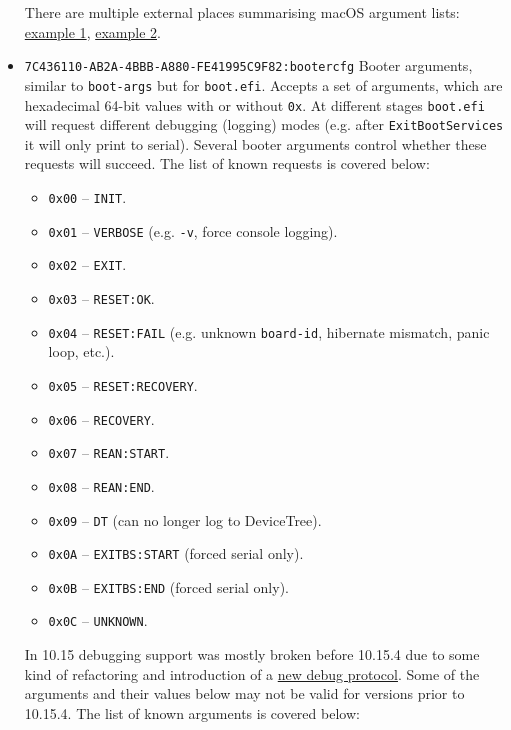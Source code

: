 \documentclass[]{article}
\providecommand{\tightlist}{%
  \setlength{\itemsep}{0pt}\setlength{\parskip}{0pt}}
\begin{document}
\begin{itemize}
  There are multiple external places summarising macOS argument lists:
  \href{https://osxeon.wordpress.com/2015/08/10/boot-argument-options-in-os-x}{example 1},
  \href{https://superuser.com/questions/255176/is-there-a-list-of-available-boot-args-for-darwin-os-x}{example 2}.

\item
  \texttt{7C436110-AB2A-4BBB-A880-FE41995C9F82:bootercfg}
  \break
  Booter arguments, similar to \texttt{boot-args} but for \texttt{boot.efi}. Accepts a set of
  arguments, which are hexadecimal 64-bit values with or without \texttt{0x}.
  At different stages \texttt{boot.efi} will request different debugging (logging)
  modes (e.g. after \texttt{ExitBootServices} it will only print to serial).
  Several booter arguments control whether these requests will succeed. The
  list of known requests is covered below:

  \begin{itemize}
  \tightlist
  \item \texttt{0x00} -- \texttt{INIT}.
  \item \texttt{0x01} -- \texttt{VERBOSE} (e.g. \texttt{-v}, force console logging).
  \item \texttt{0x02} -- \texttt{EXIT}.
  \item \texttt{0x03} -- \texttt{RESET:OK}.
  \item \texttt{0x04} -- \texttt{RESET:FAIL} (e.g. unknown \texttt{board-id}, hibernate mismatch, panic loop, etc.).
  \item \texttt{0x05} -- \texttt{RESET:RECOVERY}.
  \item \texttt{0x06} -- \texttt{RECOVERY}.
  \item \texttt{0x07} -- \texttt{REAN:START}.
  \item \texttt{0x08} -- \texttt{REAN:END}.
  \item \texttt{0x09} -- \texttt{DT} (can no longer log to DeviceTree).
  \item \texttt{0x0A} -- \texttt{EXITBS:START} (forced serial only).
  \item \texttt{0x0B} -- \texttt{EXITBS:END} (forced serial only).
  \item \texttt{0x0C} -- \texttt{UNKNOWN}.
  \end{itemize}

  In 10.15 debugging support was mostly broken before 10.15.4 due to some
  kind of refactoring and introduction of a
  \href{https://github.com/acidanthera/OpenCorePkg/blob/master/Include/Apple/Protocol/AppleDebugLog.h}{new debug protocol}.
  Some of the arguments and their values below may not be valid for versions prior
  to 10.15.4. The list of known arguments is covered below:


\end{itemize}
\end{document}
